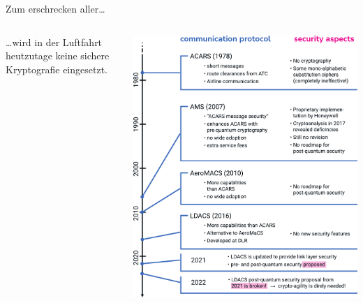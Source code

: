 \begin{frame}[c]{Zum erschrecken aller…}
  \begin{columns}[fullwidth,c]
    \begin{column}{.5\linewidth}
      \begin{itemize}

        \footnotesize
        …wird in der Luftfahrt heutzutage keine sichere Kryptografie eingesetzt. 
      \end{itemize}
    \end{column}%
    \begin{column}{.5\linewidth}
      \includegraphics[width=.92\linewidth]{graphics/history of cryptography in avionics}
    \end{column}
  \end{columns}
\end{frame}


